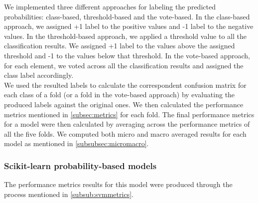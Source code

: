         We implemented three different approaches for labeling the predicted probabilities: class-based, threshold-based and 
        the vote-based. In the class-based approach, we assigned +1 label to the positive values and -1 label to the negative values. 
        In the threshold-based approach, we applied a threshold value to all the classification results. We assigned +1 label to the values 
        above the assigned threshold and -1 to the values below that threshold. In the vote-based approach, for each element, 
        we voted across all the classification results and assigned the class label accordingly.\\
        
        We used the resulted labels to calculate the correspondent confusion matrix for each class of a fold 
        (or a fold in the vote-based approach) by evaluating the produced labels against the original ones. 
        We then calculated the performance metrics mentioned in \ref{subsec:metrics} 
        for each fold. The final performance metrics for a model were then calculated by averaging across the performance metrics 
        of all the five folds. We computed both micro and macro averaged results for each 
        model as mentioned in \ref{subsubsec:micromacro}.\\

        \subsubsection{Scikit-learn probability-based models}
        The performance metrics results for this model were produced through the process mentioned in \ref{subsub:svmmetrics}.